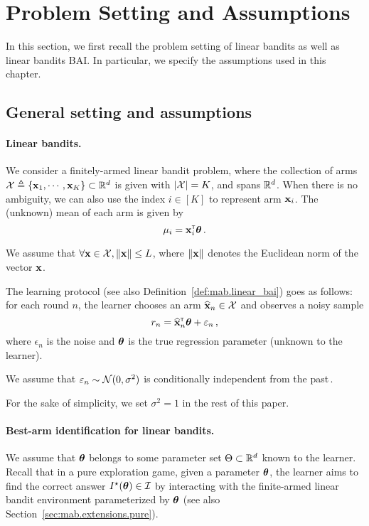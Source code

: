 \section{Problem Setting and Assumptions}\label{sec:lgc.formulation}

In this section, we first recall the problem setting of linear bandits as well as linear bandits BAI. In particular, we specify the assumptions used in this chapter.

\subsection{General setting and assumptions}\label{sec:lgc.formulation.general}

\paragraph{Linear bandits.}
We consider a finitely-armed linear bandit problem, where the collection of arms $\mathcal{X}\triangleq\{{\bf x}_1,\cdots,{\bf x}_K\}\subset \mathbb{R}^d$ is given with $|\mathcal{X}|=K$, and spans $\mathbb{R}^d$. When there is no ambiguity, we can also use the index $i\in[K]$ to represent arm ${\bf x}_i$. The (unknown) mean of each arm is given by
\[
    \mu_i = {\bf x}_i^\mathsf{\scriptscriptstyle T}{\boldsymbol \theta}\,.
\]

\begin{assumption}
\begin{leftbar}[assumptionbar]
    We assume that $\forall {\bf x}\in\mathcal{X}, \left\lVert{\bf x}\right\rVert\leq L$, where $\left\lVert{\bf x}\right\rVert$ denotes the Euclidean norm of the vector ${\bf x}$.
\end{leftbar}
\end{assumption}

The learning protocol (see also Definition~\ref{def:mab.linear_bai}) goes as follows: for each round $n$, the learner chooses an arm $\widehat{{\bf x}}_n\in\mathcal{X}$ and observes a noisy sample
\[
    r_n = \widehat{{\bf x}}_n^\mathsf{\scriptscriptstyle T}{\boldsymbol \theta} +\varepsilon_n\,,
\]
where $\epsilon_n$ is the noise and ${\boldsymbol \theta}$ is the true regression parameter (unknown to the learner).
\begin{assumption}
\begin{leftbar}[assumptionbar]
    We assume that $\varepsilon_n \sim \mathcal{N}(0,\sigma^2)$ is conditionally independent from the past\,.
\end{leftbar}
\end{assumption}
For the sake of simplicity, we set $\sigma^2 = 1$ in the rest of this paper.

\paragraph{Best-arm identification for linear bandits.}
We assume that ${\boldsymbol \theta}$ belongs to some parameter set $\Theta\subset\mathbb{R}^d$ known to the learner. Recall that in a pure exploration game, given a parameter ${\boldsymbol \theta}$, the learner aims to find the correct answer $I^\star({\boldsymbol \theta})\in\mathcal{I}$ by interacting with the finite-armed linear bandit environment parameterized by ${\boldsymbol \theta}$ (see also Section~\ref{sec:mab.extensions.pure}).

